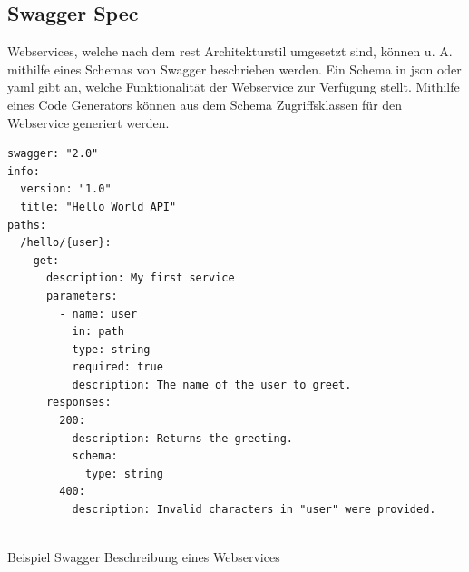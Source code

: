 \subsection{Swagger Spec}
Webservices, welche nach dem \gls{rest} Architekturstil umgesetzt sind, können u. A. mithilfe eines Schemas von Swagger \cite{swagger} beschrieben werden. Ein Schema in \gls{json} oder \gls{yaml} gibt an, welche Funktionalität der Webservice zur Verfügung stellt. Mithilfe eines Code Generators können aus dem Schema Zugriffsklassen für den Webservice generiert werden.

\begin{listing}[H]
\begin{verbatim}
swagger: "2.0"
info:
  version: "1.0"
  title: "Hello World API"
paths:
  /hello/{user}:
    get:
      description: My first service
      parameters:
        - name: user
          in: path
          type: string
          required: true
          description: The name of the user to greet.
      responses:
        200:
          description: Returns the greeting.
          schema:
            type: string
        400:
          description: Invalid characters in "user" were provided.
          
\end{verbatim}
\caption{Beispiel Swagger Beschreibung eines Webservices}
\end{listing}